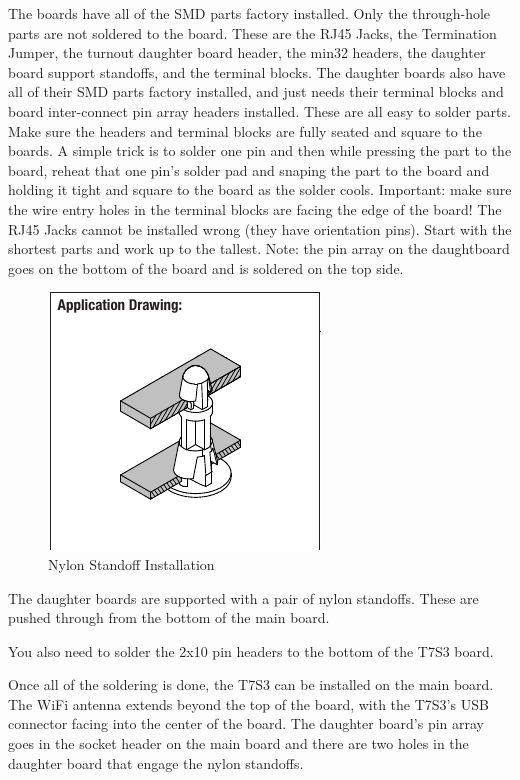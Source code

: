 \documentclass[12pt,twoside]{article}
\begin{document}
The boards have all of the SMD parts factory installed. Only the through-hole
parts are not soldered to the board. These are the RJ45 Jacks, the Termination
Jumper, the turnout daughter board header, the min32 headers, the daughter
board support standoffs, and the terminal blocks. The daughter boards also
have all of their SMD parts factory installed, and just needs their terminal
blocks and board inter-connect pin array headers installed. These are all easy
to solder parts. Make sure the headers and terminal blocks are fully seated
and square to the boards. A simple trick is to solder one pin and then while
pressing the part to the board, reheat that one pin's solder pad and snaping
the part to the board and holding it tight and square to the board as the
solder cools. Important: make sure the wire entry holes in the terminal blocks
are facing the edge of the board! The RJ45 Jacks cannot be installed wrong
(they have orientation pins). Start with the shortest parts and work up to the
tallest. Note: the pin array on the daughtboard goes on the bottom of the
board and is soldered on the top side.


\begin{figure}[hbpt]\begin{centering}%
\includegraphics{NylonStandoffInstall.png}
\caption{Nylon Standoff Installation}
\end{centering}\end{figure}

The daughter boards are supported with a pair of nylon standoffs.  These are 
pushed through from the bottom of the main board.

You also need to solder the 2x10 pin headers to the bottom of the T7S3 board.


Once all of the soldering is done, the T7S3 can be installed on the main board.
The WiFi antenna extends beyond the top of the board, with the T7S3's USB 
connector facing into the center of the board.  The daughter board's pin array 
goes in the socket header on the main board and there are two holes in the 
daughter board that engage the nylon standoffs.
\end{document}

